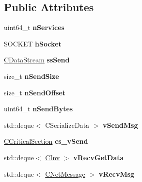 \subsection*{Public Attributes}
\begin{DoxyCompactItemize}
\item 
\mbox{\label{class_c_node_a8259db81211f6837585c6f82f89414ff}} 
uint64\+\_\+t {\bfseries n\+Services}
\item 
\mbox{\label{class_c_node_a7cda6efa6a9ef9db3eebe70fc3bdd45a}} 
S\+O\+C\+K\+ET {\bfseries h\+Socket}
\item 
\mbox{\label{class_c_node_a6174b5a3d8d8f6a2daf02be3cf04dc63}} 
\mbox{\hyperlink{class_c_data_stream}{C\+Data\+Stream}} {\bfseries ss\+Send}
\item 
\mbox{\label{class_c_node_a3c99b7e2b0e53feb58f6859453456f74}} 
size\+\_\+t {\bfseries n\+Send\+Size}
\item 
\mbox{\label{class_c_node_a090bda86de6b84c3db83e1f029d4f453}} 
size\+\_\+t {\bfseries n\+Send\+Offset}
\item 
\mbox{\label{class_c_node_a33e24a9544df3c60f9e1ec05b5e91051}} 
uint64\+\_\+t {\bfseries n\+Send\+Bytes}
\item 
\mbox{\label{class_c_node_a68e5fb1a80fe4247aa577a3c9a74b399}} 
std\+::deque$<$ C\+Serialize\+Data $>$ {\bfseries v\+Send\+Msg}
\item 
\mbox{\label{class_c_node_a79edcac83fc5067567c7b41c26fcc56f}} 
\mbox{\hyperlink{class_annotated_mixin}{C\+Critical\+Section}} {\bfseries cs\+\_\+v\+Send}
\item 
\mbox{\label{class_c_node_a9649c1f27ff0d8f0ba89eb1ea5bee139}} 
std\+::deque$<$ \mbox{\hyperlink{class_c_inv}{C\+Inv}} $>$ {\bfseries v\+Recv\+Get\+Data}
\item 
\mbox{\label{class_c_node_a015361812daa5b6ebb9a5692ddf67a54}} 
std\+::deque$<$ \mbox{\hyperlink{class_c_net_message}{C\+Net\+Message}} $>$ {\bfseries v\+Recv\+Msg}
\item 

\end{DoxyCompactItemize}
